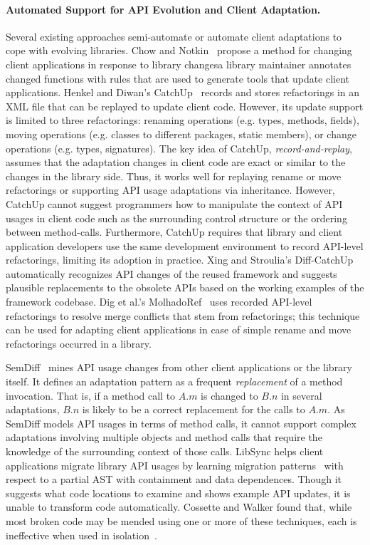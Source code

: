 \paragraph{{Automated Support for API Evolution and Client Adaptation.}} 
Several existing approaches semi-automate or automate client adaptations to cope with evolving libraries.  Chow and Notkin~\cite{Chow1996} propose a method for changing client applications in response to library changes\textemdash a library maintainer annotates changed functions with rules that are used to generate tools that update client applications. Henkel and Diwan's CatchUp~\cite{Henkel2005} records and stores refactorings in an XML file that can be replayed to update client code. However, its update support is limited to three refactorings: renaming operations (e.g.  types, methods, fields), moving operations (e.g. classes to different packages, static members), or change operations (e.g. types, signatures). The key idea of CatchUp, {\em record-and-replay}, assumes that the adaptation changes in client code are exact or similar to the changes in the library side. Thus, it works well for replaying rename or move refactorings or supporting API usage adaptations via inheritance. However, CatchUp cannot suggest programmers how to manipulate the context of API usages in client code such as the surrounding control structure or the ordering between method-calls. Furthermore, CatchUp requires that library and client application developers use the same development environment to record API-level refactorings, limiting its adoption in practice. Xing and Stroulia's Diff-CatchUp~\cite{Xing2007:diffcatchup} automatically recognizes API changes of the reused framework and suggests plausible replacements to the obsolete APIs based on the working examples of the framework codebase. Dig et al.'s MolhadoRef~\cite{Dig2007} uses recorded API-level refactorings to resolve merge conflicts that stem from refactorings; this technique can be used for adapting client applications in case of simple rename and move refactorings occurred in a library.  

SemDiff~\cite{Dagenais2008:RAC} mines API usage changes from other client applications or the library itself.  It defines an adaptation pattern as a frequent {\em replacement} of a method invocation. That is, if a method call to $A.m$ is changed to $B.n$ in several adaptations, $B.n$ is likely to be a correct replacement for the calls to $A.m$. As SemDiff models API usages in terms of method calls, it cannot support complex adaptations involving multiple objects and method calls that require the knowledge of the surrounding context of those calls. LibSync helps client applications migrate library API usages by learning migration patterns~\cite{Nguyen2010:GAA} with respect to a partial AST with containment and data dependences. Though it suggests what code locations to examine and shows example API updates, it is {unable} to transform code automatically. Cossette and Walker found that, while most broken code may be mended using one or more of these techniques, each is ineffective when used in isolation~\cite{cossette2012}.  

